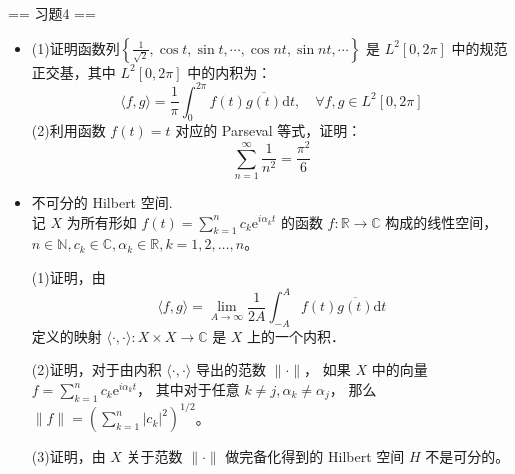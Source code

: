 == 习题4 ==
\begin{itemize}
	\item[1](1)证明函数列$\left\{\frac{1}{\sqrt{2}}, \cos t, \sin t, \cdots, \cos n t, \sin n t, \cdots\right\}$ 是 $L^{2}[0,2 \pi]$ 中的规范正交基，其中 $L^{2}[0,2 \pi]$ 中的内积为：
	$$
	\langle f, g \rangle=\frac{1}{\pi} \int_{0}^{2 \pi} f(t) \overline{g(t)} \mathrm{d} t, \quad \forall f, g \in L^{2}[0,2 \pi]
	$$
	(2)利用函数 $f(t)=t$ 对应的 Parseval 等式，证明：
	$$\sum_{n=1}^{\infty} \frac{1}{n^{2}}=\frac{\pi^{2}}{6}$$
	\item[2]不可分的 Hilbert 空间. \\
	记 $X$ 为所有形如 $\displaystyle f(t)=\sum_{k=1}^{n} c_{k} \mathrm{e}^{i \alpha_{k} t}$ 的函数 $f: \mathbb{R} \rightarrow \mathbb{C}$ 构成的线性空间，
	$n \in \mathbb{N}, c_{k} \in \mathbb{C}, \alpha_{k} \in \mathbb{R}, k=1,2, \ldots, n$。\par
	(1)证明，由
		$$
		\langle f, g\rangle=\lim_{A \rightarrow \infty} \frac{1}{2 A} \int_{-A}^{A} f(t) \overline{g(t)} \mathrm{d} t
		$$
		定义的映射 $\langle\cdot, \cdot\rangle: X \times X \rightarrow \mathbb{C}$ 是 $X$ 上的一个内积．\par 
	(2)证明，对于由内积 $\langle\cdot, \cdot\rangle$ 导出的范数 $\|\cdot\|$，
		如果 $X$ 中的向量 $\displaystyle f=\sum_{k=1}^{n} c_{k} \mathrm{e}^{i \alpha_{k} t}$，
		其中对于任意 $k \neq j, \alpha_{k} \neq \alpha_{j}$，
		那么 $\displaystyle \|f\|=\left(\sum_{k=1}^{n}|c_{k}|^{2}\right)^{1 / 2}$。\par 
	(3)证明，由 $X$ 关于范数 $\|\cdot\|$ 做完备化得到的 Hilbert 空间 $H$ 不是可分的。
	

\end{itemize}
